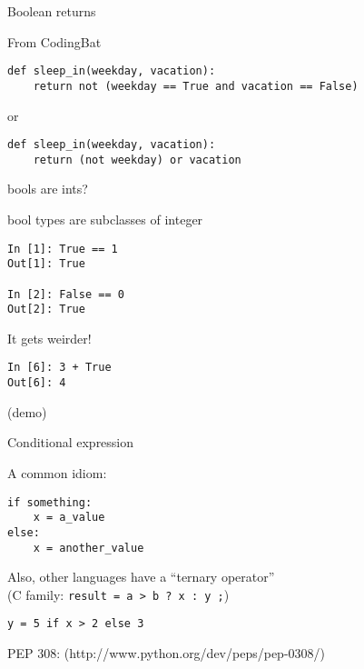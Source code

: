 \documentclass{beamer}
\begin{document}
\begin{frame}[fragile]{Boolean returns}

{\Large From CodingBat}


\begin{verbatim}
def sleep_in(weekday, vacation):
    return not (weekday == True and vacation == False)
\end{verbatim}

or

\begin{verbatim}
def sleep_in(weekday, vacation):
    return (not weekday) or vacation
\end{verbatim}


\end{frame}


\begin{frame}[fragile]{bools are ints?}

{\Large bool types are subclasses of integer}

\begin{verbatim}
In [1]: True == 1
Out[1]: True

In [2]: False == 0
Out[2]: True  
\end{verbatim}

{\Large It gets weirder! }

\begin{verbatim}
In [6]: 3 + True
Out[6]: 4
\end{verbatim}

(demo)

\end{frame}

\begin{frame}[fragile]{Conditional expression}

{\large A common idiom:}
\begin{verbatim}
if something:
    x = a_value
else:
    x = another_value
\end{verbatim}
\vfill
{\large Also, other languages have a ``ternary operator''}\\
\hspace{0.2in}(C family: \verb|result = a > b ? x : y ;|)

\vfill
{ \Large \verb|y = 5 if x > 2 else 3| }

\vfill
{\large PEP 308:}
(http://www.python.org/dev/peps/pep-0308/)

\end{frame}
\end{document}
